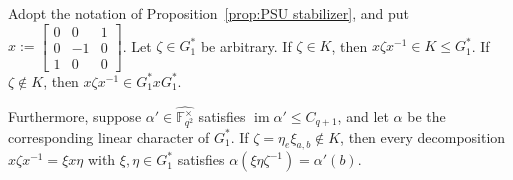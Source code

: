 \begin{lemma}
\label{lem:PSUdcsts}
Adopt the notation of Proposition~\ref{prop:PSU stabilizer}, and put $x := \begin{bmatrix}
0 & 0 & 1 \\
0 & -1 & 0 \\
1 & 0 & 0
\end{bmatrix}$.
Let $\zeta \in G_1^*$ be arbitrary.
If $\zeta \in K$, then $x\zeta x^{-1} \in K \leq G_1^*$.
If $\zeta \notin K$, then $x \zeta x^{-1} \in G_1^* x G_1^*$.

Furthermore, suppose $\alpha' \in \widehat{ \mathbb{F}_{q^2}^\times}$ satisfies $\operatorname{im} \alpha' \leq C_{q+1}$, and let $\alpha$ be the corresponding linear character of $G_1^*$.
If $\zeta = \eta_e \xi_{a,b} \notin K$, then every decomposition $x \zeta x^{-1} = \xi x \eta$ with $\xi,\eta \in G_1^*$ satisfies $\alpha(\xi \eta \zeta^{-1}) = \alpha'(b)$.
\end{lemma}


